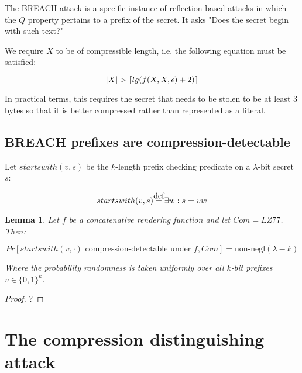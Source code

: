 \documentclass{article}
\DeclarePairedDelimiter{\ceil}{\lceil}{\rceil}
\newtheorem*{lemma}{Lemma}
\newcommand\defeq{\stackrel{\mathclap{\normalfont\mbox{def}}}{=}}
\begin{document}
The BREACH attack is a specific instance of reflection-based attacks in which
the $Q$ property pertains to a prefix of the secret. It asks "Does the secret
begin with such text?"

We require $X$ to be of compressible length,
i.e. the following equation must be satisfied:

\begin{equation*}
    |X| > \ceil{lg(f(X, X, \epsilon) + 2)}
\end{equation*}

In practical terms, this requires the secret that needs to be stolen
to be at least 3 bytes so that it is better compressed rather than
represented as a literal.

\subsection{BREACH prefixes are compression-detectable}

Let $startswith(v, s)$ be the $k$-length prefix checking predicate on a
$\lambda$-bit secret $s$:

\begin{equation*}
    startswith(v, s) \defeq \exists w: s = v w
\end{equation*}

\begin{lemma}

Let $f$ be a concatenative rendering function and let $Com = LZ77$. Then:

\begin{equation}
Pr[startswith(v, \cdot) \textrm{ compression-detectable under } f, Com] = \text{non-negl}(\lambda - k)
\end{equation}

Where the probability randomness is taken uniformly over all $k$-bit prefixes $v \in \{0, 1\}^k$.

\end{lemma}

\begin{proof}
?
\end{proof}

\section{The compression distinguishing attack}
\end{document}
